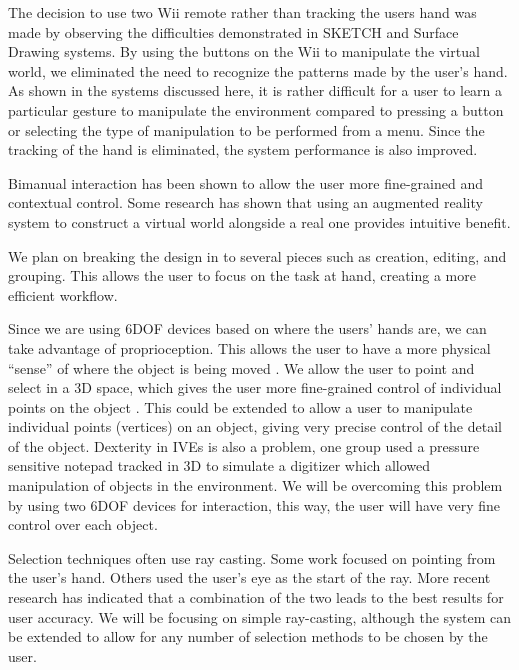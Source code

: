 The decision to use two Wii remote rather than tracking the users hand was made by observing the difficulties demonstrated in SKETCH\cite{SKETCH} and Surface Drawing \cite{Drawing} systems. By using the buttons on the Wii to manipulate the virtual world, we eliminated the need to recognize the patterns made by the user’s hand. As shown in the systems discussed here, it is rather difficult for a user to learn a particular gesture to manipulate the environment compared to pressing a button or selecting the type of manipulation to be performed from a menu. Since the tracking of the hand is eliminated, the system performance is also improved.

Bimanual interaction has been shown to allow the user more fine-grained and contextual control\cite{Zeleznik:1997:TPI:253284.253316}.
Some research has shown that using an augmented reality system to construct a virtual world alongside a real one provides intuitive benefit\cite{Jota:2011:CVM:1979742.1979915}.

We plan on breaking the design in to several pieces such as creation, editing, and grouping. This allows the user to focus on the task at hand, creating a more efficient workflow\cite{Butterworth:1992:3DM}.

Since we are using 6DOF devices based on where the users' hands are, we can take advantage of proprioception.
This allows the user to have a more physical ``sense'' of where the object is being moved \cite{Mine:MovingObjects}.
We allow the user to point and select in a 3D space, which gives the user more fine-grained control of individual points on the object \cite{5759472}.
This could be extended to allow a user to manipulate individual points (vertices) on an object, giving very precise control of the detail of the object.
Dexterity in IVEs is also a problem, one group used a pressure sensitive notepad tracked in 3D to simulate a digitizer which allowed manipulation of objects in the environment\cite{658467}.
We will be overcoming this problem by using two 6DOF devices for interaction, this way, the user will have very fine control over each object.

Selection techniques often use ray casting.
Some work focused on pointing from the user's hand\cite{Mine:MovingObjects}.
Others used the user's eye as the start of the ray\cite{Pierce:1997:IPI:253284.253303}.
More recent research has indicated that a combination of the two leads to the best results for user accuracy\cite{5307641}.
We will be focusing on simple ray-casting, although the system can be extended to allow for any number of selection methods to be chosen by the user.

